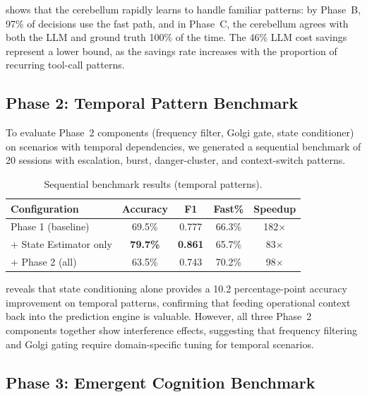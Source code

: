 \documentclass[11pt,a4paper]{article}
\begin{document}
 shows that the cerebellum rapidly learns to handle familiar patterns: by Phase~B, 97\% of decisions use the fast path, and in Phase~C, the cerebellum agrees with both the LLM and ground truth 100\% of the time.
The 46\% LLM cost savings represent a lower bound, as the savings rate increases with the proportion of recurring tool-call patterns.

\subsection{Phase 2: Temporal Pattern Benchmark}\label{sec:temporal}

To evaluate Phase~2 components (frequency filter, Golgi gate, state conditioner) on scenarios with temporal dependencies, we generated a sequential benchmark of 20 sessions with escalation, burst, danger-cluster, and context-switch patterns.

\begin{table}[t]
\centering
\caption{Sequential benchmark results (temporal patterns).}
\label{tab:sequential}
\begin{tabular}{lcccc}
\toprule
Configuration & Accuracy & F1 & Fast\% & Speedup \\
\midrule
Phase 1 (baseline) & 69.5\% & 0.777 & 66.3\% & 182$\times$ \\
+ State Estimator only & \textbf{79.7\%} & \textbf{0.861} & 65.7\% & 83$\times$ \\
+ Phase 2 (all) & 63.5\% & 0.743 & 70.2\% & 98$\times$ \\
\bottomrule
\end{tabular}
\end{table}

 reveals that state conditioning alone provides a 10.2 percentage-point accuracy improvement on temporal patterns, confirming that feeding operational context back into the prediction engine is valuable.
However, all three Phase~2 components together show interference effects, suggesting that frequency filtering and Golgi gating require domain-specific tuning for temporal scenarios.

\subsection{Phase 3: Emergent Cognition Benchmark}\label{sec:phase3_exp}
\end{document}
